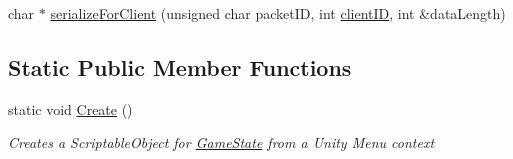 \begin{DoxyCompactItemize}
\item 
char $\ast$ \hyperlink{class_game_state_a291fcda337b1a25c21871fe338399c27}{serialize\-For\-Client} (unsigned char packet\-I\-D, int \hyperlink{class_game_state_a7c5acf663dc54a1d6de3254209b8fff2}{client\-I\-D}, int \&data\-Length)
\end{DoxyCompactItemize}
\subsection*{Static Public Member Functions}
\begin{DoxyCompactItemize}
\item 
static void \hyperlink{class_game_state_a2f3154927e33e16bd595b4aece996c61}{Create} ()
\begin{DoxyCompactList}\small\item\em Creates a Scriptable\-Object for \hyperlink{class_game_state}{Game\-State} from a Unity Menu context \end{DoxyCompactList}\end{DoxyCompactItemize}
